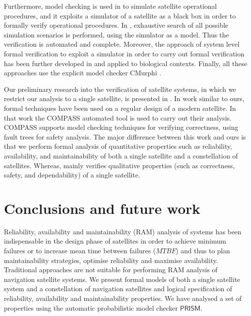 \documentclass[preprint,12pt]{qrei}
\begin{document}
Furthermore, model checking is used in \cite{CMM+11} to simulate satellite operational procedures, and it exploits a simulator of a satellite as a black box in order to formally verify operational procedures. In \cite{CMM+11, GCM+12}, exhaustive search of all possible simulation scenarios is performed, using the simulator as a model. Thus the verification is automated and complete. Moreover, the approach of system level formal verification to exploit a simulator in order to carry out formal verification has been further developed in \cite{MMM+13,MMM+14} and applied to biological contexts. Finally, all these approaches use the explicit model checker CMurphi \cite{PIM+04}.

Our preliminary research into the verification of satellite systems, in which we restrict our analysis to a single satellite, is presented in \cite{PLM+13}. In work \cite{EKY+12} similar to ours, formal techniques have been used on a regular design of a modern satellite. In that work the COMPASS automated tool is used to carry out their analysis. COMPASS \cite{BCK+11} supports model checking techniques for verifying correctness, using fault trees for safety analysis. The major difference between this work and ours is that we perform formal analysis of quantitative properties such as reliability, availability, and maintainability of both a single satellite and a constellation of satellites. Whereas, \cite{EKY+12} mainly verifies qualitative properties (such as correctness, safety, and dependability) of a single satellite.



\section{Conclusions and future work}
\label{sect:conclusion}

Reliability, availability and maintainability (RAM) analysis of systems has been indispensable in the design phase of satellites in order to achieve minimum failures or to increase mean time between failures ($MTBF$) and thus to plan maintainability strategies, optimise reliability and maximise availability. Traditional approaches are not suitable for performing RAM analysis of navigation satellite systems. We present formal models of both a single satellite system and a constellation of navigation satellites and logical specification of reliability, availability and maintainability properties. We have analysed a set of properties using the automatic probabilistic model checker $\mathsf{PRISM}$.
\end{document}
